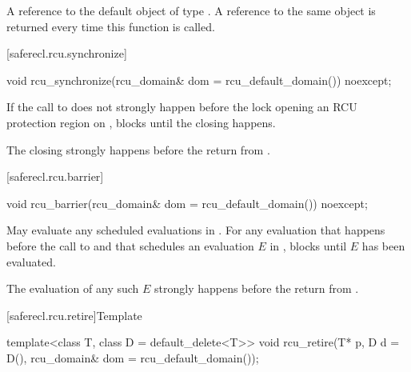 \begin{itemdescr}

\pnum
\returns
A reference to the default object of type .
A reference to the same object is returned every time this
function is called.

\end{itemdescr}

[saferecl.rcu.synchronize]{}

\begin{itemdecl}
void rcu_synchronize(rcu_domain& dom = rcu_default_domain()) noexcept;
\end{itemdecl}

\begin{itemdescr}

\pnum
\effects
If the call to  does not strongly
happen before the lock opening an RCU protection region 
on , blocks until the  closing 
happens.

\pnum
\sync
The  closing  strongly
happens before the return from .

\end{itemdescr}

[saferecl.rcu.barrier]{}

\begin{itemdecl}
void rcu_barrier(rcu_domain& dom = rcu_default_domain()) noexcept;
\end{itemdecl}

\begin{itemdescr}

\pnum
\effects
May evaluate any scheduled evaluations in
. For any evaluation that happens before the call
to  and that schedules an evaluation $E$
in , blocks until $E$ has been evaluated.

\pnum
\sync
The evaluation of any such $E$ strongly
happens before the return from .

\end{itemdescr}

[saferecl.rcu.retire]{Template }

\begin{itemdecl}
template<class T, class D = default_delete<T>>
void rcu_retire(T* p, D d = D(), rcu_domain& dom = rcu_default_domain());
\end{itemdecl}

